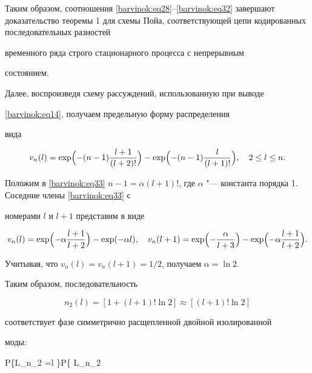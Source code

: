 Таким образом, соотношения \eqref{barvinok:eq28}--\eqref{barvinok:eq32} завершают доказательство теоремы 1 для схемы Пойа, соответствующей цепи кодированных последовательных разностей

временного ряда строго стационарного процесса с непрерывным

состоянием.



Далее, воспроизведя схему рассуждений, использованную при выводе

\eqref{barvinok:eq14}, получаем предельную форму распределения

вида

\begin{equation}

\label{barvinok:eq33} 

v_n (l)=\exp \Bigl( -(

n-1)\frac{l+1}{(l+2)!} \Bigr)-\exp \Bigl(

-(n-1)\frac{l}{(l+1)!}\Bigr), \quad 2\le l\le n.

\end{equation}

Положим в \eqref{barvinok:eq33} $n-1=\alpha (l+1)!$, где $\alpha

$ "--- константа порядка 1. Соседние члены \eqref{barvinok:eq33} с

номерами $l$ и $l+1$ представим в виде 

$$v_n (l)=\exp \Bigl(-\alpha \frac{l+1}{l+2} \Bigr)-\exp (-\alpha l),

\quad 

v_n (l+1)=\exp \Bigl(-\frac{\alpha }{l+3} \Bigr)-\exp \Bigl(-\alpha \frac{l+1}{l+2} \Bigr).$$

Учитывая, что $v_n (l)=v_n(l+1)={1}/{2}$, получаем $\alpha =\ln  2$. 

Таким образом, последовательность

\begin{equation}

\label{barvinok:eq34} n_2 ( l )=[1+(l+1)!\ln 2]\approx [(l+1)!\ln

2 ]

\end{equation}


соответствует фазе симметрично расщепленной двойной изолированной

моды: 

$$P\left\{L_{n_2} =l \right\}\approx P\left\{ L_{n_2}

